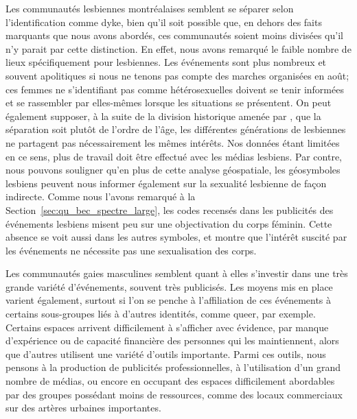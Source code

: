 Les communautés lesbiennes montréalaises semblent se séparer selon l'identification comme dyke, bien qu'il soit possible que, en dehors des faits marquants que nous avons abordés, ces communautés soient moins divisées qu'il n'y parait par cette distinction.
En effet, nous avons remarqué le faible nombre de lieux spécifiquement pour lesbiennes.
Les événements sont plus nombreux et souvent apolitiques si nous ne tenons pas compte des marches organisées en août; ces femmes ne s'identifiant pas comme hétérosexuelles doivent se tenir informées et se rassembler par elles-mêmes lorsque les situations se présentent.
On peut également supposer, à la suite de la division historique amenée par \citet{Giraud2014}, que la séparation soit plutôt de l'ordre de l'âge, les différentes générations de lesbiennes ne partagent pas nécessairement les mêmes intérêts.
Nos données étant limitées en ce sens, plus de travail doit être effectué avec les médias lesbiens.
Par contre, nous pouvons souligner qu'en plus de cette analyse géospatiale, les géosymboles lesbiens peuvent nous informer également sur la sexualité lesbienne de façon indirecte.
Comme nous l'avons remarqué à la Section~\ref{sec:qu_bec_spectre_large}, les codes recensés dans les publicités des événements lesbiens misent peu sur une objectivation du corps féminin.
Cette absence se voit aussi dans les autres symboles, et montre que l'intérêt suscité par les événements ne nécessite pas une sexualisation des corps.

Les communautés gaies masculines semblent quant à elles s'investir dans une très grande variété d'événements, souvent très publicisés.
Les moyens mis en place varient également, surtout si l'on se penche à l'affiliation de ces événements à certains sous-groupes liés à d'autres identités, comme queer, par exemple.
Certains espaces arrivent difficilement à s'afficher avec évidence, par manque d'expérience ou de capacité financière des personnes qui les maintiennent, alors que d'autres utilisent une variété d'outils importante.
Parmi ces outils, nous pensons à la production de publicités professionnelles, à l'utilisation d'un grand nombre de médias, ou encore en occupant des espaces difficilement abordables par des groupes possédant moins de ressources, comme des locaux commerciaux sur des artères urbaines importantes.

